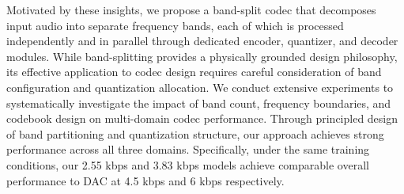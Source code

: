 \documentclass[11pt]{article}
\begin{document}
Motivated by these insights, we propose a band-split codec that decomposes input audio into separate frequency bands, each of which is processed independently and in parallel through dedicated encoder, quantizer, and decoder modules. While band-splitting provides a physically grounded design philosophy, its effective application to codec design requires careful consideration of band configuration and quantization allocation. We conduct extensive experiments to systematically investigate the impact of band count, frequency boundaries, and codebook design on multi-domain codec performance. Through principled design of band partitioning and quantization structure, our approach achieves strong performance across all three domains. Specifically, under the same training conditions, our 2.55 kbps and 3.83 kbps models achieve comparable overall performance to DAC at 4.5 kbps and 6 kbps respectively.
\end{document}
